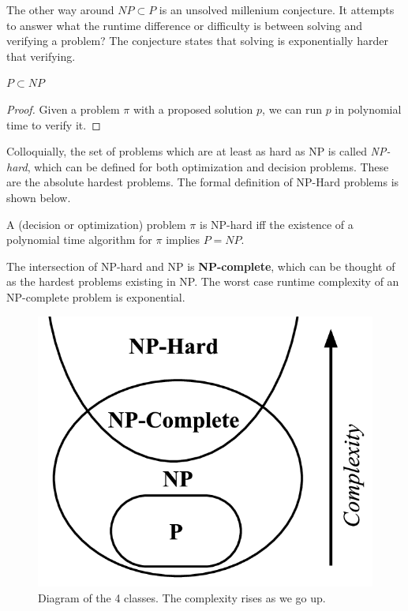   The other way around $NP \subset P$ is an unsolved millenium conjecture. It attempts to answer what the runtime difference or difficulty is between solving and verifying a problem? The conjecture states that solving is exponentially harder that verifying. 

  \begin{theorem}
    $P \subset NP$
  \end{theorem}
  \begin{proof}
    Given a problem $\pi$ with a proposed solution $p$, we can run $p$ in polynomial time to verify it. 
  \end{proof}

  Colloquially, the set of problems which are at least as hard as NP is called \textit{NP-hard}, which can be defined for both optimization and decision problems. These are the absolute hardest problems. The formal definition of NP-Hard problems is shown below. 

  \begin{definition}[NP-Hard]
    A (decision or optimization) problem $\pi$ is NP-hard iff the existence of a polynomial time algorithm for $\pi$ implies $P = NP$. 
  \end{definition}

  \begin{definition}[NP-Complete]
    The intersection of NP-hard and NP is \textbf{NP-complete}, which can be thought of as the hardest problems existing in NP. The worst case runtime complexity of an NP-complete problem is exponential. 
  \end{definition}

  \begin{figure}[H]
    \centering 
    \includegraphics[scale=0.3]{img/class.png}
    \caption{Diagram of the 4 classes. The complexity rises as we go up. } 
    \label{fig:class}
  \end{figure}
  

